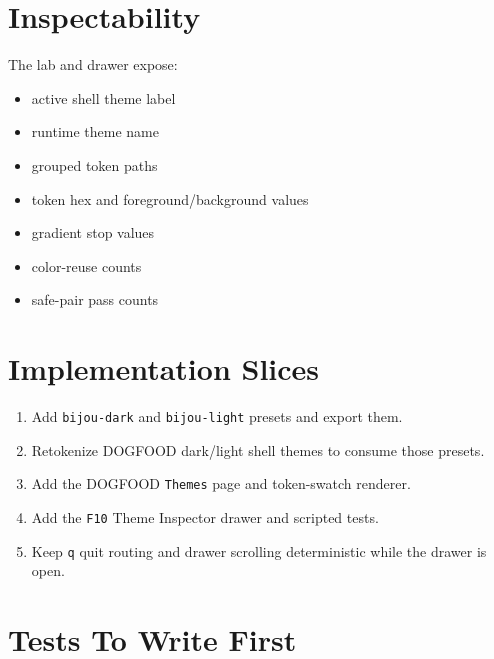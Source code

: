 \section{Inspectability}\label{record-179-inspectability}

The lab and drawer expose:

\begin{itemize}
\tightlist
\item
  active shell theme label
\item
  runtime theme name
\item
  grouped token paths
\item
  token hex and foreground/background values
\item
  gradient stop values
\item
  color-reuse counts
\item
  safe-pair pass counts
\end{itemize}

\section{Implementation Slices}\label{record-179-implementation-slices}

\begin{enumerate}
\def\labelenumi{\arabic{enumi}.}
\tightlist
\item
  Add \texttt{b\allowbreak{}i\allowbreak{}j\allowbreak{}o\allowbreak{}u\allowbreak{}-\allowbreak{}d\allowbreak{}a\allowbreak{}r\allowbreak{}k} and \texttt{b\allowbreak{}i\allowbreak{}j\allowbreak{}o\allowbreak{}u\allowbreak{}-\allowbreak{}l\allowbreak{}i\allowbreak{}g\allowbreak{}h\allowbreak{}t} presets and export them.
\item
  Retokenize DOGFOOD dark/light shell themes to consume those presets.
\item
  Add the DOGFOOD \texttt{T\allowbreak{}h\allowbreak{}e\allowbreak{}m\allowbreak{}e\allowbreak{}s} page and token-swatch renderer.
\item
  Add the \texttt{F\allowbreak{}1\allowbreak{}0} Theme Inspector drawer and scripted tests.
\item
  Keep \texttt{q} quit routing and drawer scrolling deterministic while the drawer is open.
\end{enumerate}

\section{Tests To Write First}\label{record-179-tests-to-write-first}

